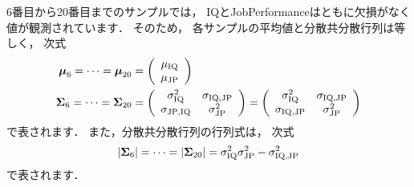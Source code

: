 \documentclass[a4j]{jarticle}\usepackage[]{graphicx}\usepackage[]{color}
\begin{document}
6番目から20番目までのサンプルでは，
IQとJobPerformanceはともに欠損がなく
値が観測されています．
そのため，
各サンプルの平均値と分散共分散行列は等しく，
次式
\begin{align}
\mbox{\boldmath $\mu$}_{6} = \dots = \mbox{\boldmath $\mu$}_{20} &= 
  \left(
    \begin{array}{c}
    \mu_{\mathrm{IQ}} \\
    \mu_{\mathrm{JP}}
    \end{array}
  \right) \\
\mbox{\boldmath $\Sigma$}_{6} = \dots = \mbox{\boldmath $\Sigma$}_{20} &=
  \left(
    \begin{array}{cc}
    \sigma_{\mathrm{IQ}}^2 & \sigma_{\mathrm{IQ}, \mathrm{JP}} \\
    \sigma_{\mathrm{JP}, \mathrm{IQ}} & \sigma_{\mathrm{JP}}^2
    \end{array}
  \right)
= \left(
    \begin{array}{cc}
    \sigma_{\mathrm{IQ}}^2 & \sigma_{\mathrm{IQ}, \mathrm{JP}} \\
    \sigma_{\mathrm{IQ}, \mathrm{JP}} & \sigma_{\mathrm{JP}}^2
    \end{array}
  \right)
\end{align}
で表されます．
また，分散共分散行列の行列式は，
次式
\begin{equation}
|\mbox{\boldmath $\Sigma$}_{6}| = \dots = |\mbox{\boldmath $\Sigma$}_{20}| =
  \sigma_{\mathrm{IQ}}^2 \sigma_{\mathrm{JP}}^2 - \sigma_{\mathrm{IQ}, \mathrm{JP}}^2
\end{equation}
で表されます．
\end{document}
